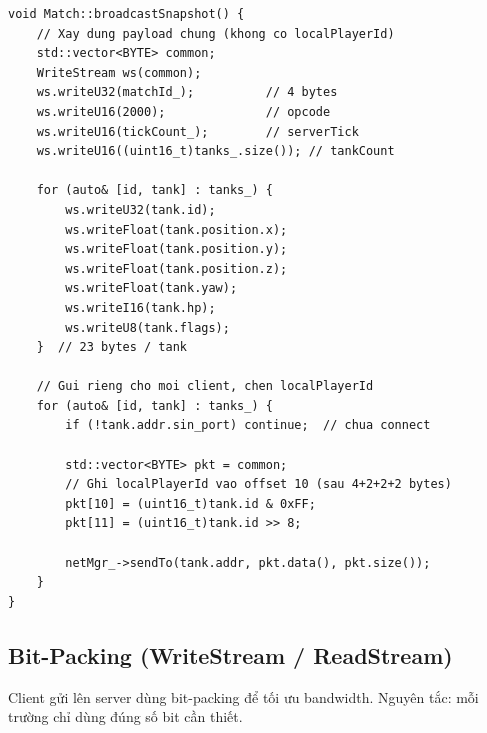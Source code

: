 \documentclass[12pt,a4paper]{report}
\begin{document}
\begin{lstlisting}[style=cppStyle, caption={Tạo và gửi S2C\_SNAPSHOT đến tất cả clients}, label={lst:snapshot2}]
void Match::broadcastSnapshot() {
    // Xay dung payload chung (khong co localPlayerId)
    std::vector<BYTE> common;
    WriteStream ws(common);
    ws.writeU32(matchId_);          // 4 bytes
    ws.writeU16(2000);              // opcode
    ws.writeU16(tickCount_);        // serverTick
    ws.writeU16((uint16_t)tanks_.size()); // tankCount

    for (auto& [id, tank] : tanks_) {
        ws.writeU32(tank.id);
        ws.writeFloat(tank.position.x);
        ws.writeFloat(tank.position.y);
        ws.writeFloat(tank.position.z);
        ws.writeFloat(tank.yaw);
        ws.writeI16(tank.hp);
        ws.writeU8(tank.flags);
    }  // 23 bytes / tank

    // Gui rieng cho moi client, chen localPlayerId
    for (auto& [id, tank] : tanks_) {
        if (!tank.addr.sin_port) continue;  // chua connect

        std::vector<BYTE> pkt = common;
        // Ghi localPlayerId vao offset 10 (sau 4+2+2+2 bytes)
        pkt[10] = (uint16_t)tank.id & 0xFF;
        pkt[11] = (uint16_t)tank.id >> 8;

        netMgr_->sendTo(tank.addr, pkt.data(), pkt.size());
    }
}
\end{lstlisting}

\subsection{Bit-Packing (WriteStream / ReadStream)}

Client gửi lên server dùng bit-packing để tối ưu bandwidth. Nguyên tắc: mỗi trường chỉ dùng đúng số bit cần thiết.
\end{document}
